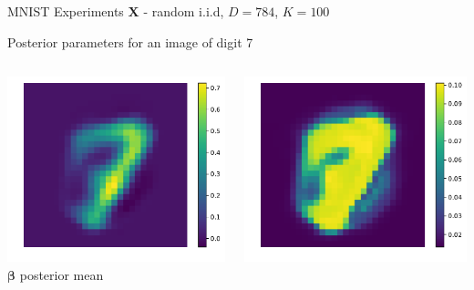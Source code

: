 \documentclass[9pt]{beamer}
\begin{document}
\begin{frame}{MNIST Experiments}
  \centering
$\mathbf{X}$ - random i.i.d, $D = 784$, $K=100$
  \begin{block}{Posterior parameters for an image of digit 7}
    \begin{columns}
      \begin{column}{0.33\textwidth}
        \centering
        \includegraphics[width=0.75\columnwidth]{graphics/posterior_mean} \\
        \(\boldsymbol\beta \) posterior mean
      \end{column}
      \begin{column}{0.33\textwidth}
        \centering
        \includegraphics[width=0.75\columnwidth]{graphics/posterior_std}\\

\end{column}
\end{columns}
\end{block}
\end{frame}
\end{document}
